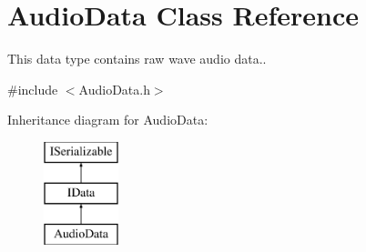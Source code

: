 \hypertarget{class_audio_data}{}\section{Audio\+Data Class Reference}
\label{class_audio_data}


This data type contains raw wave audio data..  




{\ttfamily \#include $<$Audio\+Data.\+h$>$}

Inheritance diagram for Audio\+Data\+:\begin{figure}[H]
\begin{center}
\leavevmode
\includegraphics[height=3.000000cm]{class_audio_data}
\end{center}
\end{figure}
